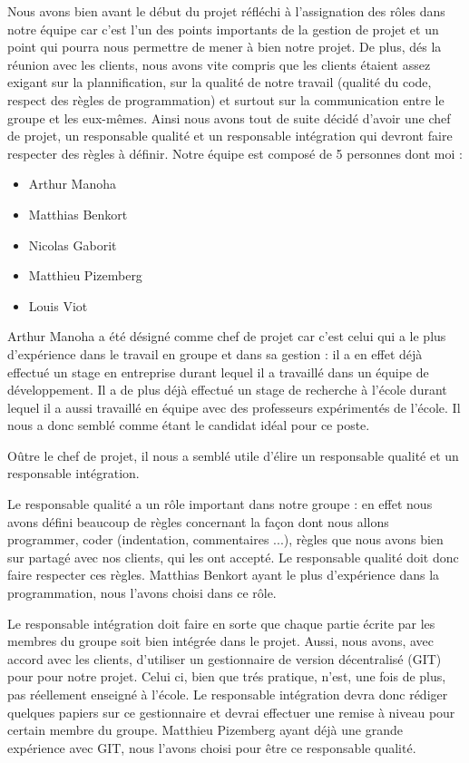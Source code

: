 Nous avons bien avant le début du projet réfléchi à l'assignation des rôles dans notre équipe car c'est l'un 
des points importants de la gestion de projet et un point qui pourra nous permettre de mener à bien notre projet. 
De plus, dés la réunion avec les clients, nous avons vite compris que les clients étaient assez exigant sur 
la plannification, sur la qualité de notre travail (qualité du code, respect des règles de programmation) et 
surtout sur la communication entre le groupe et les eux-mêmes. Ainsi nous avons tout de suite décidé d'avoir
une chef de projet, un responsable qualité et un responsable intégration qui devront faire respecter des règles
à définir. 
Notre équipe est composé de 5 personnes dont moi : \\
\begin{itemize}
\item Arthur Manoha
\item Matthias Benkort
\item Nicolas Gaborit
\item Matthieu Pizemberg
\item Louis Viot\\
\end{itemize}

	Arthur Manoha a été désigné comme chef de projet car c'est celui qui a le plus d'expérience dans le travail en groupe
et dans sa gestion : il a en effet déjà effectué un stage en entreprise durant lequel il a travaillé dans un équipe de 
développement. Il a de plus déjà effectué un stage de recherche à l'école durant lequel il a aussi travaillé en équipe 
avec des professeurs expérimentés de l'école. Il nous a donc semblé comme étant le candidat idéal pour ce poste. 

	Oûtre le chef de projet, il nous a semblé utile d'élire un responsable qualité et un responsable intégration. 
	
	Le responsable
qualité a un rôle important dans notre groupe : en effet nous avons défini beaucoup de règles concernant la façon dont nous 
allons programmer, coder (indentation, commentaires ...), règles que nous avons bien sur partagé avec nos clients, qui les ont accepté. 
Le responsable qualité doit donc faire respecter ces règles. Matthias Benkort ayant le plus d'expérience dans la programmation,
nous l'avons choisi dans ce rôle.

	Le responsable intégration doit faire en sorte que chaque partie écrite par les membres du groupe soit bien intégrée
	dans le projet. Aussi, nous avons, avec accord avec les clients, d'utiliser un gestionnaire de version décentralisé (GIT) pour 
	pour notre projet. Celui ci, bien que trés pratique, n'est, une fois de plus, pas réellement enseigné à l'école. Le responsable 
intégration devra donc rédiger quelques papiers sur ce gestionnaire et devrai effectuer une remise à niveau pour certain membre 
du groupe. Matthieu Pizemberg ayant déjà une grande expérience avec GIT, nous l'avons choisi pour être ce responsable qualité. 
		
